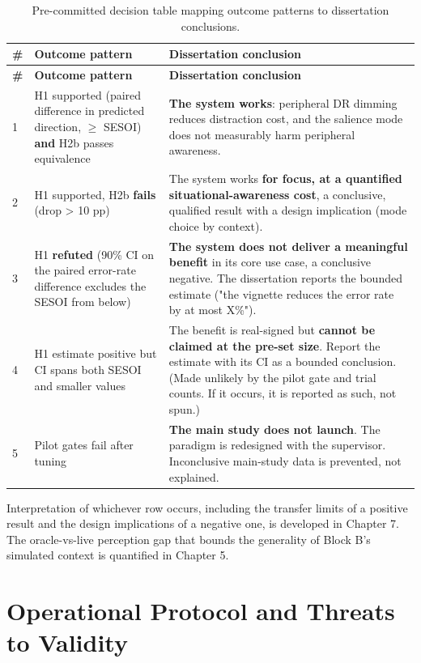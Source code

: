 \begin{longtable}{p{}|p{}|p{}}
\caption{Pre-committed decision table mapping outcome patterns to dissertation conclusions.}\\
\hline
\textbf{\#} & \textbf{Outcome pattern} & \textbf{Dissertation conclusion} \\
\hline
\endfirsthead
\hline
\textbf{\#} & \textbf{Outcome pattern} & \textbf{Dissertation conclusion} \\
\hline
\endhead
\hline
1 & H1 supported (paired difference in predicted direction, $\geq$ SESOI) \textbf{and} H2b passes equivalence & \textbf{The system works}: peripheral DR dimming reduces distraction cost, and the salience mode does not measurably harm peripheral awareness. \\
2 & H1 supported, H2b \textbf{fails} (drop > 10 pp) & The system works \textbf{for focus, at a quantified situational-awareness cost}, a conclusive, qualified result with a design implication (mode choice by context). \\
3 & H1 \textbf{refuted} (90\% CI on the paired error-rate difference excludes the SESOI from below) & \textbf{The system does not deliver a meaningful benefit} in its core use case, a conclusive negative. The dissertation reports the bounded estimate ("the vignette reduces the error rate by at most X\%"). \\
4 & H1 estimate positive but CI spans both SESOI and smaller values & The benefit is real-signed but \textbf{cannot be claimed at the pre-set size}. Report the estimate with its CI as a bounded conclusion. (Made unlikely by the pilot gate and trial counts. If it occurs, it is reported as such, not spun.) \\
5 & Pilot gates fail after tuning & \textbf{The main study does not launch}. The paradigm is redesigned with the supervisor. Inconclusive main-study data is prevented, not explained. \\
\hline
\end{longtable}

Interpretation of whichever row occurs, including the transfer limits of a positive result and the
design implications of a negative one, is developed in Chapter 7. The oracle-vs-live perception gap
that bounds the generality of Block B's simulated context is quantified in Chapter 5.

\section{Operational Protocol and Threats to Validity}

